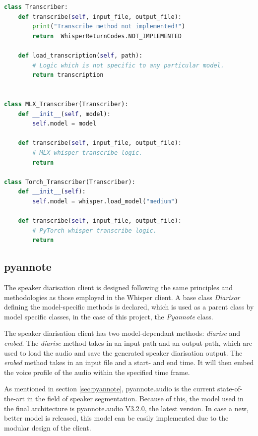 \documentclass[twoside]{uva-inf-bachelor-thesis}
\begin{document}
\begin{lstlisting}[language=Python, caption={Modular transcriber class implemented in Apple's MLX Whisper port and PyTorch's Whisper port.}]
class Transcriber:
    def transcribe(self, input_file, output_file):
        print("Transcribe method not implemented!")
        return  WhisperReturnCodes.NOT_IMPLEMENTED

    def load_transcription(self, path):
        # Logic which is not specific to any particular model.
        return transcription


class MLX_Transcriber(Transcriber):
    def __init__(self, model):
        self.model = model

    def transcribe(self, input_file, output_file):
        # MLX whisper transcribe logic.
        return

class Torch_Transcriber(Transcriber):
    def __init__(self):
        self.model = whisper.load_model("medium")

    def transcribe(self, input_file, output_file):
        # PyTorch whisper transcribe logic.
        return
\end{lstlisting}

\subsection{pyannote}
The speaker diarisation client is designed following the same principles and methodologies as those employed in the Whisper client. A base class \textit{Diarisor} defining the model-specific methods is declared, which is used as a parent class by model specific classes, in the case of this project, the \textit{Pyannote} class.

The speaker diarisation client has two model-dependant methods: \textit{diarise} and \textit{embed}. The \textit{diarise} method takes in an input path and an output path, which are used to load the audio and save the generated speaker diarisation output. The \textit{embed} method takes in an input file and a start- and end time. It will then embed the voice profile of the audio within the specified time frame.

As mentioned in section \ref{sec:pyannote}, pyannote.audio is the current state-of-the-art in the field of speaker segmentation. Because of this, the model used in the final architecture is pyannote.audio V3.2.0, the latest version. In case a new, better model is released, this model can be easily implemented due to the modular design of the client.
\end{document}
